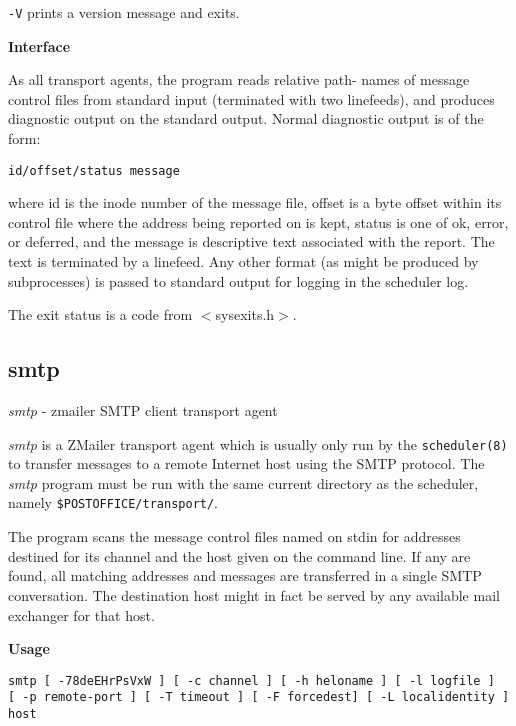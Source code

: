 {\tt -V} prints a version message and exits.

{\bf Interface}

As all transport agents, the program reads relative path-
names of message control files from standard input (terminated 
with two linefeeds), and produces diagnostic output
on the standard output. Normal diagnostic output is of
the form:

\begin{verbatim}
id/offset/status message
\end{verbatim}


where id is the inode number of the message file, offset
is a byte offset within its control file where the address
being reported on is kept, status is one of ok, error, or
deferred, and the message is descriptive text associated
with the report. The text is terminated by a linefeed.
Any other format (as might be produced by subprocesses) is
passed to standard output for logging in the scheduler
log.

The exit status is a code from {\(<\)}sysexits.h{\(>\)}.







\subsection{smtp}



{\em smtp} - zmailer SMTP client transport agent

{\em smtp} is a ZMailer transport agent which is usually only
run by the {\tt scheduler(8)} to transfer messages to a remote
Internet host using the SMTP protocol. The {\em smtp} program
must be run with the same current directory as the scheduler, 
namely {\tt \$POSTOFFICE/transport/}.

The program scans the message control files named on stdin
for addresses destined for its channel and the host given
on the command line. If any are found, all matching
addresses and messages are transferred in a single SMTP
conversation. The destination host might in fact be
served by any available mail exchanger for that host.

{\bf Usage}

\begin{verbatim}
smtp [ -78deEHrPsVxW ] [ -c channel ] [ -h heloname ] [ -l logfile ] 
[ -p remote-port ] [ -T timeout ] [ -F forcedest] [ -L localidentity ] host
\end{verbatim}

